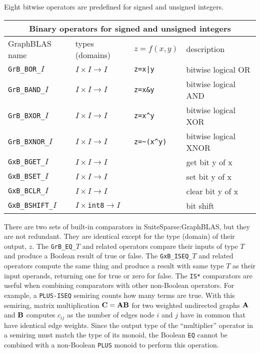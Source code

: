 \documentclass[12pt]{article}
\begin{document}
{Eight bitwise operators are predefined for signed and unsigned integers.

\vspace{0.2in}
{\footnotesize
\begin{tabular}{|llll|}
\hline
\multicolumn{4}{|c|}{Binary operators for signed and unsigned integers} \\
\hline
GraphBLAS name        & types (domains)            & $z=f(x,y)$      & description \\
\hline
\verb'GrB_BOR_'$I$    & $I \times I \rightarrow I$ & \verb'z=x|y'    & bitwise logical OR \\
\verb'GrB_BAND_'$I$   & $I \times I \rightarrow I$ & \verb'z=x&y'    & bitwise logical AND \\
\verb'GrB_BXOR_'$I$   & $I \times I \rightarrow I$ & \verb'z=x^y'    & bitwise logical XOR \\
\verb'GrB_BXNOR_'$I$  & $I \times I \rightarrow I$ & \verb'z=~(x^y)' & bitwise logical XNOR \\
\hline
\verb'GxB_BGET_'$I$    & $I \times I \rightarrow I$  & & get bit y of x \\
\verb'GxB_BSET_'$I$    & $I \times I \rightarrow I$  & & set bit y of x \\
\verb'GxB_BCLR_'$I$    & $I \times I \rightarrow I$  & & clear bit y of x \\
\verb'GxB_BSHIFT_'$I$  & $I \times $\verb'int8'$  \rightarrow I$ & & bit shift \\
\hline
\end{tabular}
}
\vspace{0.2in}

There are two sets of built-in comparators in SuiteSparse:Graph\-BLAS,
but they are not redundant.  They are identical except for the type (domain) of
their output, $z$.  The \verb'GrB_EQ_'$T$ and related operators compare their
inputs of type $T$ and produce a Boolean result of true or false.  The
\verb'GxB_ISEQ_'$T$ and related operators compute the same thing and produce a
result with same type $T$ as their input operands, returning one for true or
zero for false.  The \verb'IS*' comparators are useful when combining
comparators with other non-Boolean operators.  For example, a \verb'PLUS-ISEQ'
semiring counts how many terms are true.  With this semiring,
matrix multiplication ${\bf C=AB}$ for two weighted undirected graphs ${\bf A}$
and ${\bf B}$ computes $c_{ij}$ as the number of edges node $i$ and $j$ have in
common that have identical edge weights.  Since the output type of the
``multiplier'' operator in a semiring must match the type of its monoid, the
Boolean \verb'EQ' cannot be combined with a non-Boolean \verb'PLUS' monoid to
perform this operation.

}
\end{document}
